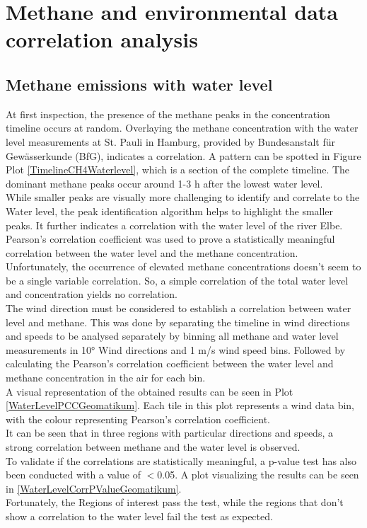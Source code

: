 \section{Methane and environmental data correlation analysis}
\subsection{Methane emissions with water level}
At first inspection, the presence of the methane peaks in the concentration timeline occurs at random. Overlaying the methane concentration with the water level measurements at St. Pauli in Hamburg, provided by Bundesanstalt für Gewässerkunde (BfG), indicates a correlation.
A pattern can be spotted in Figure Plot \cref{TimelineCH4Waterlevel}, which is a section of the complete timeline. The dominant methane peaks occur around 1-3 h after the lowest water level. \\
While smaller peaks are visually more challenging to identify and correlate to the Water level, the peak identification algorithm helps to highlight the smaller peaks. It further indicates a correlation with the water level of the river Elbe. \\
Pearson's correlation coefficient was used to prove a statistically meaningful correlation between the water level and the methane concentration. Unfortunately, the occurrence of elevated methane concentrations doesn’t seem to be a single variable correlation. So, a simple correlation of the total water level and concentration yields no correlation. \\
The wind direction must be considered to establish a correlation between water level and methane. This was done by separating the timeline in wind directions and speeds to be analysed separately by binning all methane and water level measurements in 10° Wind directions and 1 m/s wind speed bins. Followed by calculating the Pearson's correlation coefficient between the water level and methane concentration in the air for each bin.\\
A visual representation of the obtained results can be seen in Plot \cref{WaterLevelPCCGeomatikum}. Each tile in this plot represents a wind data bin, with the colour representing Pearson's correlation coefficient.\\
It can be seen that in three regions with particular directions and speeds, a strong correlation between methane and the water level is observed.\\
To validate if the correlations are statistically meaningful, a p-value test has also been conducted with a value of $<$0.05. A plot visualizing the results can be seen in \cref{WaterLevelCorrPValueGeomatikum}.\\
Fortunately, the Regions of interest pass the test, while the regions that don’t show a correlation to the water level fail the test as expected.

